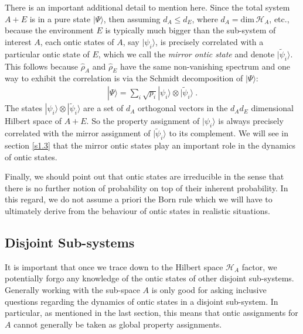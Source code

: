 \documentclass[%
preprint,
nofootinbib,
 amsmath,amssymb,
aps,
]{revtex4-1}
\def\BH{{\mathscr H}}
\def\ket#1{| #1\rangle}
\newcommand{\EQ}[1]{\begin{equation}\begin{split} #1
\end{split}\end{equation}}
\begin{document}
There is an important additional detail to mention here. 
Since the total system $A+E$ is in a pure state $\ket{\Psi}$, then assuming $d_A\leq d_E$, where $d_A=\text{dim}\,\BH_A$, etc., because 
the environment $E$ is typically much bigger than the sub-system of interest $A$, 
each ontic states of $A$, say $\ket{\psi_i}$, is precisely correlated with a particular ontic state of $E$, which we call the {\it mirror ontic state\/} and denote $\ket{\tilde\psi_i}$. This follows because 
$\hat\rho_A$ and $\hat\rho_E$ have the same non-vanishing spectrum and one way to exhibit the correlation is via the Schmidt decomposition of $\ket{\Psi}$:
\EQ{
\ket{\Psi}=\sum_i\sqrt{p_i}\ket{\psi_i}\otimes\ket{\tilde\psi_i}\ .
\label{m34}
}
The states $\ket{\psi_i}\otimes\ket{\tilde\psi_i}$ are a set of $d_A$ orthogonal vectors in the $d_Ad_E$ dimensional Hilbert space of $A+E$. So the property assignment of $\ket{\psi_i}$ is always precisely correlated with the mirror assignment of $\ket{\tilde\psi_i}$ to its complement. We will see in section \ref{s1.3} that the mirror ontic states play an important role in the dynamics of ontic states.

Finally, we should point out that ontic states are irreducible in the sense that there is no further notion of probability on top of their inherent probability. In this regard, we do not assume a priori the Born rule which we will have to ultimately derive from the behaviour of ontic states in realistic situations.

\subsection{Disjoint Sub-systems}\label{s1.12}

It is important that once we trace down to the Hilbert space $\BH_A$ factor, we potentially forgo any knowledge of the ontic states of other disjoint sub-systems. Generally working with the sub-space $A$ is only good for asking inclusive questions regarding the dynamics of ontic states in a disjoint sub-system. In particular, as mentioned in the last section, this means that ontic assignments for $A$ cannot generally be taken as global property assignments. 
\end{document}
